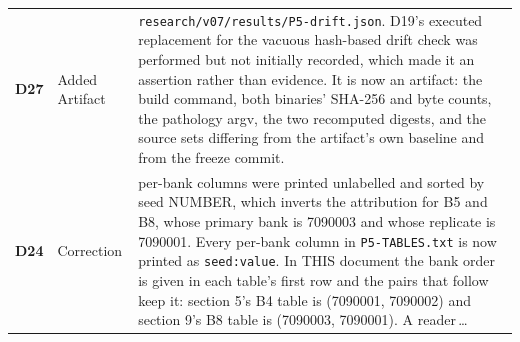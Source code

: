 \begin{xltabular}{\linewidth}{@{}l l L@{}}
\textbf{D27} & Added Artifact & \texttt{research/v07/results/P5-drift.json}. D19's executed replacement for the vacuous hash-based drift check was performed but not initially recorded, which made it an assertion rather than evidence. It is now an artifact: the build command, both binaries' SHA-256 and byte counts, the pathology argv, the two recomputed digests, and the source sets differing from the artifact's own baseline and from the freeze commit. \\
\textbf{D24} & Correction & per-bank columns were printed unlabelled and sorted by seed NUMBER, which inverts the attribution for B5 and B8, whose primary bank is 7090003 and whose replicate is 7090001. Every per-bank column in \texttt{P5-TABLES.txt} is now printed as \texttt{seed:value}. In THIS document the bank order is given in each table's first row and the pairs that follow keep it: section 5's B4 table is (7090001, 7090002) and section 9's B8 table is (7090003, 7090001). A reader\,\ldots \\
\end{xltabular}
